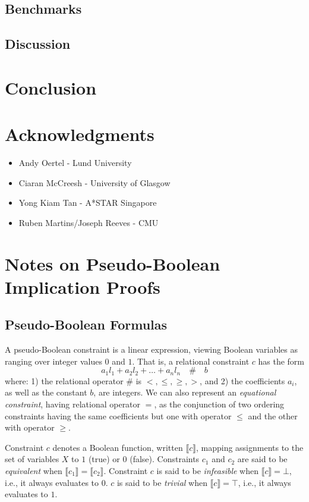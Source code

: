 \documentclass{fmcad}
\begin{document}
\subsection{Benchmarks}

\subsection{Discussion}

\section{Conclusion}

\section*{Acknowledgments}
\begin{itemize}
\item Andy Oertel - Lund University
\item Ciaran McCreesh - University of Glasgow
\item Yong Kiam Tan - A*STAR Singapore
\item Ruben Martins/Joseph Reeves - CMU
\end{itemize}

\newpage
\section{Notes on Pseudo-Boolean Implication Proofs}
\subsection{Pseudo-Boolean Formulas}
A pseudo-Boolean constraint is a linear expression, viewing Boolean variables as ranging over integer
values $0$ and $1$. That is, a relational constraint $c$ has the form
\[
  a_1 l_1 + a_2 l_2 + \dots + a_n l_n \quad \# \quad b
\]
where: 1) the relational operator $\#$ is $<, \leq, \geq, >$, and 2) the coefficients $a_i$, as
well as the constant $b$, are integers. We can also represent an \textit{equational constraint},
having relational operator $=$, as the conjunction of two ordering constraints having the same
coefficients but one with operator $\leq$ and the other with operator $\geq$.

Constraint $c$ denotes a Boolean function, written $\llbracket c \rrbracket$, mapping assignments
to the set of variables $X$ to $1$ (true) or $0$ (false). Constraints $c_1$ and $c_2$ are said
to be \textit{equivalent}  when $\llbracket c_1 \rrbracket = \llbracket c_2 \rrbracket$.
Constraint $c$ is said to be \textit{infeasible} when $\llbracket c \rrbracket = \bot$, i.e.,
it always evaluates to 0. $c$ is said to be \textit{trivial} when $\llbracket c \rrbracket = \top$,
i.e., it always evaluates to $1$.
\end{document}
